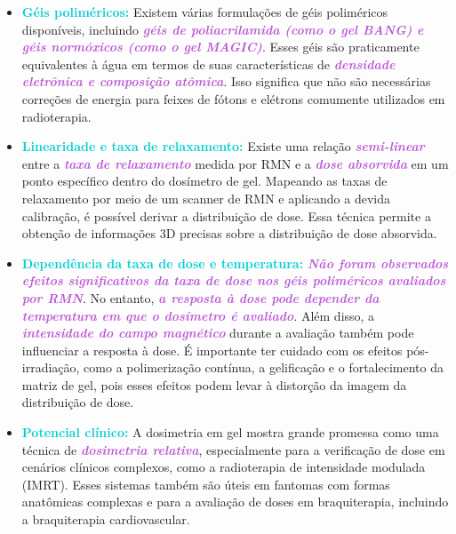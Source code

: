 \documentclass[11pt,a4paper]{article}
\newcounter{exemplo}
\begin{document}
	\begin{exemplo}
		\begin{itemize}
			\item \textcolor{DarkTurquoise}{\textbf{Géis poliméricos:}} Existem várias formulações de géis poliméricos disponíveis, incluindo \textcolor{MediumOrchid}{\textit{\textbf{géis de poliacrilamida (como o gel BANG) e géis normóxicos (como o gel MAGIC)}}}. Esses géis são praticamente equivalentes à água em termos de suas características de \textcolor{MediumOrchid}{\textit{\textbf{densidade eletrônica e composição atômica}}}. Isso significa que não são necessárias correções de energia para feixes de fótons e elétrons comumente utilizados em radioterapia.
			\item \textcolor{DarkTurquoise}{\textbf{Linearidade e taxa de relaxamento:}} Existe uma relação \textcolor{MediumOrchid}{\textit{\textbf{semi-linear}}} entre a \textcolor{MediumOrchid}{\textit{\textbf{taxa de relaxamento}}} medida por RMN e a \textcolor{MediumOrchid}{\textit{\textbf{dose absorvida}}} em um ponto específico dentro do dosímetro de gel. Mapeando as taxas de relaxamento por meio de um scanner de RMN e aplicando a devida calibração, é possível derivar a distribuição de dose. Essa técnica permite a obtenção de informações 3D precisas sobre a distribuição de dose absorvida.
			\item \textcolor{DarkTurquoise}{\textbf{Dependência da taxa de dose e temperatura:}} \textcolor{MediumOrchid}{\textit{\textbf{Não foram observados efeitos significativos da taxa de dose nos géis poliméricos avaliados por RMN}}}. No entanto, \textcolor{MediumOrchid}{\textit{\textbf{a resposta à dose pode depender da temperatura em que o dosímetro é avaliado}}}. Além disso, a \textcolor{MediumOrchid}{\textit{\textbf{intensidade do campo magnético}}} durante a avaliação também pode influenciar a resposta à dose. É importante ter cuidado com os efeitos pós-irradiação, como a polimerização contínua, a gelificação e o fortalecimento da matriz de gel, pois esses efeitos podem levar à distorção da imagem da distribuição de dose.
			\item \textcolor{DarkTurquoise}{\textbf{Potencial clínico:}} A dosimetria em gel mostra grande promessa como uma técnica de \textcolor{MediumOrchid}{\textit{\textbf{dosimetria relativa}}}, especialmente para a verificação de dose em cenários clínicos complexos, como a radioterapia de intensidade modulada (IMRT). Esses sistemas também são úteis em fantomas com formas anatômicas complexas e para a avaliação de doses em braquiterapia, incluindo a braquiterapia cardiovascular.
		\end{itemize}
	\end{exemplo}
\end{document}
